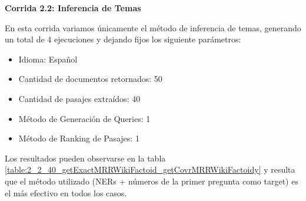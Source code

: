 \medskip
\textbf{Corrida 2.2: Inferencia de Temas}\newline

En esta corrida variamos únicamente el método de inferencia de temas, generando un total de 4 ejecuciones y dejando fijos los siguiente parámetros: \newline


\begin{itemize}
  \item Idioma: Español
  \item Cantidad de documentos retornados: 50
  \item Cantidad de pasajes extraídos: 40
  \item Método de Generación de Queries: 1
  \item Método de Ranking de Pasajes: 1
\end{itemize}

Los resultados pueden observarse en la tabla \ref{table:2_2_40_getExactMRRWikiFactoid_getCovrMRRWikiFactoidy} y resulta que el método utilizado (NERs + números de la primer pregunta como target) es el más efectivo en todos los casos.\newline

